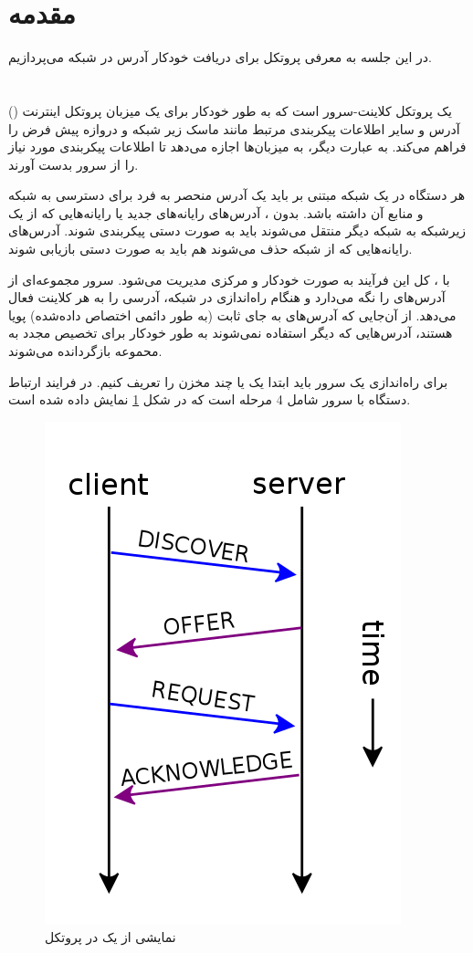 \documentclass[12pt]{article}
\begin{document}
\section*{مقدمه}
در این جلسه به معرفی پروتکل    برای دریافت خودکار آدرس در شبکه می‌پردازیم.
\section{}
 یک پروتکل کلاینت-سرور است که به طور خودکار برای یک میزبان پروتکل اینترنت () آدرس  و سایر اطلاعات پیکربندی مرتبط مانند ماسک زیر شبکه  و دروازه پیش فرض  را فراهم می‌کند.
به عبارت دیگر،  به میزبان‌ها اجازه می‌دهد تا اطلاعات پیکربندی مورد نیاز را از سرور  بدست آورند.

هر دستگاه در یک شبکه مبتنی بر  باید یک آدرس  منحصر به فرد برای دسترسی به شبکه و منابع آن داشته باشد. بدون ، آدرس‌های  رایانه‌های جدید یا رایانه‌هایی که از یک زیرشبکه به شبکه دیگر منتقل می‌شوند باید به صورت دستی پیکربندی شوند. آدرس‌های  رایانه‌هایی که از شبکه حذف می‌شوند هم باید به صورت دستی بازیابی شوند.

با ، کل این فرآیند به صورت خودکار و مرکزی مدیریت می‌شود. سرور  مجموعه‌ای از آدرس‌های  را نگه می‌دارد و هنگام راه‌اندازی در شبکه، آدرسی را به هر کلاینت فعال  می‌دهد. از آن‌جایی که آدرس‌های  به جای ثابت (به طور دائمی اختصاص داده‌شده) پویا هستند، آدرس‌هایی که دیگر استفاده نمی‌شوند به طور خودکار برای تخصیص مجدد به محموعه  بازگردانده می‌شوند.

برای راه‌اندازی یک سرور  باید ابتدا یک یا چند مخزن   را تعریف کنیم. در  فرایند ارتباط دستگاه با سرور  شامل 4 مرحله است که در شکل \ref{fig:dhcp-session} نمایش داده شده است.

\begin{figure}[h!]
	\centering
	\includegraphics[width=0.3\columnwidth]{figs/DHCP_session.png}
	\caption{نمایشی از یک  در پروتکل }
	\label{fig:dhcp-session}
\end{figure}
\end{document}
